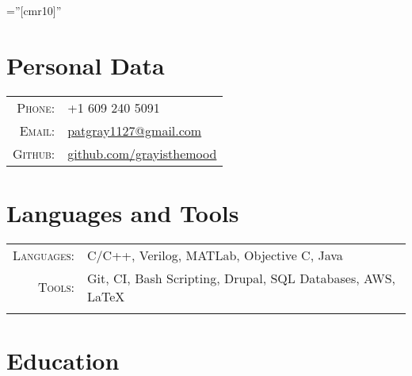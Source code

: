 \documentclass[a4paper,10pt, onepage]{article} %
\begin{document}
\pagestyle{empty} 
\font\fb=''[cmr10]'' %

\par{\par} %
\par{\par}

\section{Personal Data}
\begin{tabular}{rp{10cm}}
\textsc{Phone:} & +1 609 240 5091 \\
\textsc{Email:} & \href{mailto:patgray1127@gmail.com}{patgray1127@gmail.com}\\
\textsc{Github:} & \href{http://github.com/grayisthemood}{github.com/grayisthemood}\\
\end{tabular}



\section{Languages and Tools}

\begin{tabular}{rp{10cm}}
\textsc{Languages:} & C/C++, Verilog, MATLab, Objective C, Java\\
\textsc {Tools:} & Git, CI, Bash Scripting, Drupal, SQL Databases, AWS, \LaTeX\\
\multicolumn{2}{c}{}\\
\end{tabular}


\section{Education}
\end{document}
